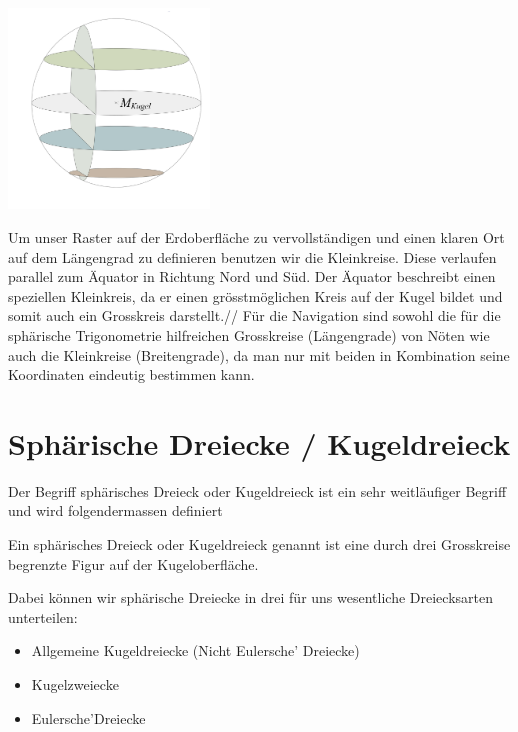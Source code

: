 \begin{refsection}
\begin{center}
        \includegraphics[width=0.4\textwidth]{kugel/_Kleinkreis.jpg}
\end{center}

Um unser Raster auf der Erdoberfläche zu vervollständigen und einen klaren Ort auf dem Längengrad zu definieren benutzen wir die Kleinkreise. Diese verlaufen parallel zum Äquator in Richtung Nord und Süd. Der Äquator beschreibt einen speziellen Kleinkreis, da er einen grösstmöglichen Kreis auf der Kugel bildet und somit auch ein Grosskreis darstellt.//
Für die Navigation sind sowohl die für die sphärische Trigonometrie hilfreichen Grosskreise (Längengrade) von Nöten wie auch die Kleinkreise (Breitengrade), da man nur mit beiden in Kombination seine Koordinaten eindeutig bestimmen kann.



\section{Sphärische Dreiecke / Kugeldreieck}
Der Begriff sphärisches Dreieck oder Kugeldreieck ist ein sehr weitläufiger Begriff und wird folgendermassen definiert

\begin{definition}
Ein sphärisches Dreieck oder Kugeldreieck genannt ist eine durch drei Grosskreise begrenzte Figur auf der Kugeloberfläche.
\end{definition} 

Dabei können wir sphärische Dreiecke in drei für uns wesentliche Dreiecksarten unterteilen:

\begin{itemize}
\item Allgemeine Kugeldreiecke (Nicht Eulersche’ Dreiecke)
\item Kugelzweiecke
\item Eulersche’Dreiecke
\end{itemize}



\end{refsection}

